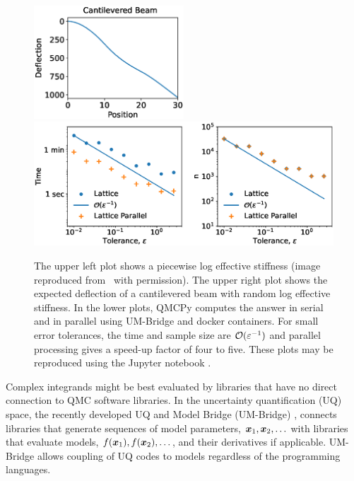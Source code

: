 \documentclass[graybox]{svmult}
\begin{document}
\begin{figure}[t]
    \centering
    \includegraphics[width=0.5\textwidth]{cantileveredbeamwords.eps}
    \includegraphics[width=1\textwidth]{ldparallelbeam.eps}
    \caption{The upper left plot shows a piecewise log effective stiffness (image reproduced from~\cite{ParSee22a} with permission). The upper right plot shows the expected deflection of a cantilevered beam with random log effective stiffness. In the lower plots, QMCPy computes the answer in serial and in parallel using UM-Bridge and docker containers.  For small error tolerances, the time and sample size are ${\mathcal{O}}(\varepsilon^{-1})$ and parallel processing gives a speed-up factor of four to five. These plots may be reproduced using the Jupyter notebook \cite{MCQMC2022Figs}.  }
    \label{CDHJSfigbeam}
\end{figure}


Complex integrands might be best evaluated by libraries that have no direct connection to QMC software libraries.  In the uncertainty quantification (UQ) space, the recently developed UQ and Model Bridge (UM-Bridge) \cite{UMBridge23}, connects libraries that generate sequences of model parameters, ${\boldsymbol{x}}_1, {\boldsymbol{x}}_2, \ldots$ with libraries that evaluate models, $f({\boldsymbol{x}}_1), f({\boldsymbol{x}}_2), \ldots$, and their derivatives if applicable. UM-Bridge allows coupling of UQ codes to models regardless of the programming languages.
\end{document}
